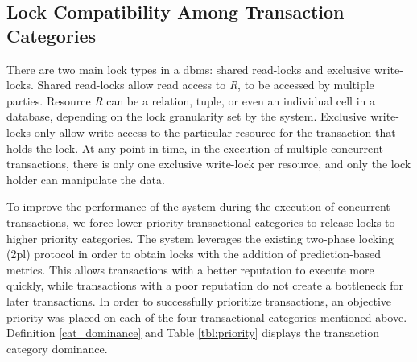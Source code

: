 \subsection{Lock Compatibility Among Transaction Categories}
\label{pbs:lock_compatibility}
There are two main lock types in a \gls{dbms}: shared read-locks and exclusive write-locks. Shared read-locks allow read access to \textit{R}, to be accessed by multiple parties. Resource \textit{R} can be a relation, tuple, or even an individual cell in a database, depending on the lock granularity set by the system. Exclusive write-locks only allow write access to the particular resource for the transaction that holds the lock. At any point in time, in the execution of multiple concurrent transactions, there is only one exclusive write-lock per resource, and only the lock holder can manipulate the data.

To improve the performance of the system during the execution of concurrent transactions, we force lower priority transactional categories to release locks to higher priority categories. The system leverages the existing two-phase locking (\gls{2pl}) protocol in order to obtain locks with the addition of prediction-based metrics. This allows transactions with a better reputation to execute more quickly, while transactions with a poor reputation do not create a bottleneck for later transactions. In order to successfully prioritize transactions, an objective priority was placed on each of the four transactional categories mentioned above. Definition \ref{cat_dominance} and Table \ref{tbl:priority} displays the transaction category dominance.

